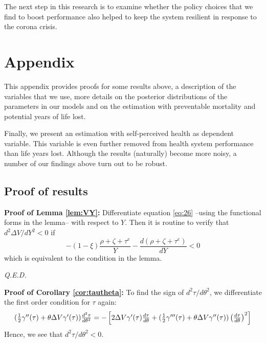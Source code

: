 \documentclass[12pt,english,a4paper]{article}
\newcommand{\qed}{\hspace*{\fill} {\em Q.E.D.}}
\begin{document}
The next step in this research is to examine whether the policy choices that we find to boost performance also helped to keep the system resilient in response to the corona crisis.





\newpage
\appendix



\section{Appendix}
\label{sec:orgbcce33c}

This appendix provides proofs for some results above, a description of the variables that we use, more details on the posterior distributions of the parameters in our models and on the estimation with preventable mortality and potential years of life lost.

Finally, we present an estimation with self-perceived health as dependent variable. This variable is even further removed from health system performance than life years lost. Although the results (naturally) become more noisy, a number of our findings above turn out to be robust.

\subsection{Proof of results}
\label{sec:orgce584f0}

\textbf{Proof of Lemma \ref{lem:VY}:}
Differentiate equation \eqref{eq:26} --using the functional forms in the lemma-- with respect to \(Y\). Then it is routine to verify that \(d^2 \Delta V/dY^2 < 0\) if
\begin{equation}
\label{eq:39}
-(1-\xi) \frac{\rho+\zeta+\tau^e}{Y} - \frac{d(\rho+\zeta+\tau^e)}{dY} < 0
\end{equation}
which is equivalent to the condition in the lemma.

 \qed




\textbf{Proof of Corollary \ref{cor:tautheta}:}
To find the sign of \(d^2\tau/d\theta^2\), we differentiate the first order condition for \(\tau\) again:
\begin{equation}
\label{eq:36}
(\textstyle{1\over 2} \gamma''(\tau) + \theta \Delta V \gamma'(\tau)) \frac{d^2\tau}{d\theta^2} = -\left[ 2\Delta V \gamma'(\tau) \frac{d\tau}{d\theta} + (\textstyle{1\over 2} \gamma'''(\tau) + \theta \Delta V \gamma''(\tau)) \left(\frac{d\tau}{d\theta} \right)^2    \right]
\end{equation}
Hence, we see that \(d^2 \tau/d\theta^2 < 0\).
\end{document}
